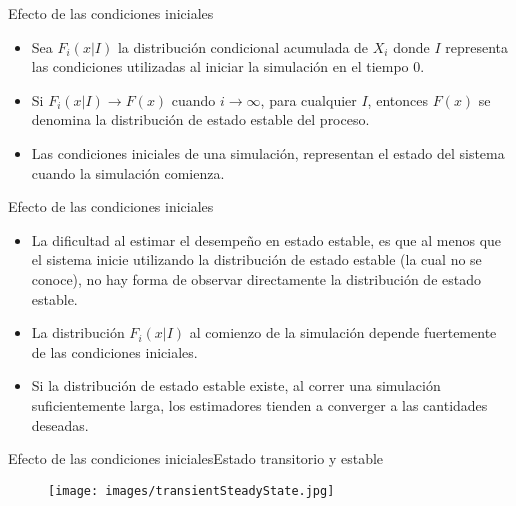 \begin{frame}{Efecto de las condiciones iniciales}
    \begin{itemize}
        
        \item Sea $F_i(x|I)$ la distribución condicional acumulada de $X_i$ donde $I$ representa las condiciones utilizadas al iniciar la simulación en el tiempo 0. 
        \item Si $F_i(x|I)\rightarrow F(x)$ cuando $i \rightarrow \infty$, para cualquier $I$, entonces $F(x)$ se denomina la distribución de estado estable del proceso. 
        \item Las condiciones iniciales de una simulación, representan el estado del sistema cuando la simulación comienza.
    \end{itemize}
\end{frame}

\begin{frame}{Efecto de las condiciones iniciales}
    \begin{itemize}
        \item La dificultad al estimar el desempeño en estado estable, es que al menos que el sistema inicie utilizando la distribución de estado estable (la cual no se conoce), no hay forma de observar directamente la distribución de estado estable.
        \item La distribución $F_i(x|I)$ al comienzo de la simulación depende fuertemente de las condiciones iniciales.
        \item Si la distribución de estado estable existe, al correr una simulación suficientemente larga, los estimadores tienden a converger a las cantidades deseadas.
    \end{itemize}
\end{frame}

\begin{frame}{Efecto de las condiciones iniciales}{Estado transitorio y estable}
    \begin{figure}
        \centering
        \texttt{[image: images/transientSteadyState.jpg]}
        \label{fig:TransientSteadyState}
    \end{figure}
\end{frame}

